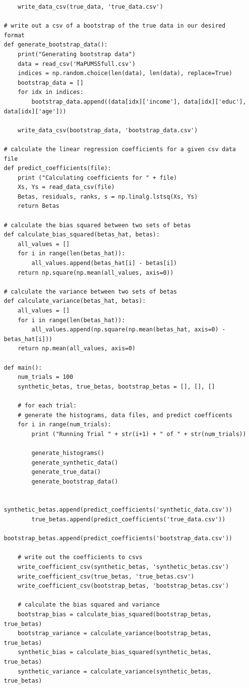 \documentclass[12pt]{article}
\begin{document}
\begin{appendices}
\begin{lstlisting}
    write_data_csv(true_data, 'true_data.csv')

# write out a csv of a bootstrap of the true data in our desired format
def generate_bootstrap_data():
    print("Generating bootstrap data")
    data = read_csv('MaPUMS5full.csv')
    indices = np.random.choice(len(data), len(data), replace=True)
    bootstrap_data = []
    for idx in indices:
        bootstrap_data.append((data[idx]['income'], data[idx]['educ'], data[idx]['age']))

    write_data_csv(bootstrap_data, 'bootstrap_data.csv')    

# calculate the linear regression coefficients for a given csv data file
def predict_coefficients(file):
    print ("Calculating coefficients for " + file)
    Xs, Ys = read_data_csv(file)
    Betas, residuals, ranks, s = np.linalg.lstsq(Xs, Ys)
    return Betas

# calculate the bias squared between two sets of betas
def calculate_bias_squared(betas_hat, betas):
    all_values = []
    for i in range(len(betas_hat)):
        all_values.append(betas_hat[i] - betas[i])
    return np.square(np.mean(all_values, axis=0))

# calculate the variance between two sets of betas
def calculate_variance(betas_hat, betas):
    all_values = []
    for i in range(len(betas_hat)):
        all_values.append(np.square(np.mean(betas_hat, axis=0) - betas_hat[i]))
    return np.mean(all_values, axis=0)

def main():
    num_trials = 100
    synthetic_betas, true_betas, bootstrap_betas = [], [], []

    # for each trial:
    # generate the histograms, data files, and predict coefficents
    for i in range(num_trials):
        print ("Running Trial " + str(i+1) + " of " + str(num_trials))

        generate_histograms()
        generate_synthetic_data()
        generate_true_data()
        generate_bootstrap_data()

        synthetic_betas.append(predict_coefficients('synthetic_data.csv'))
        true_betas.append(predict_coefficients('true_data.csv'))
        bootstrap_betas.append(predict_coefficients('bootstrap_data.csv'))

    # write out the coefficients to csvs
    write_coefficient_csv(synthetic_betas, 'synthetic_betas.csv')
    write_coefficient_csv(true_betas, 'true_betas.csv')
    write_coefficient_csv(bootstrap_betas, 'bootstrap_betas.csv')

    # calculate the bias squared and variance
    bootstrap_bias = calculate_bias_squared(bootstrap_betas, true_betas)
    bootstrap_variance = calculate_variance(bootstrap_betas, true_betas)
    synthetic_bias = calculate_bias_squared(synthetic_betas, true_betas)
    synthetic_variance = calculate_variance(synthetic_betas, true_betas)


\end{lstlisting}
\end{appendices}
\end{document}

